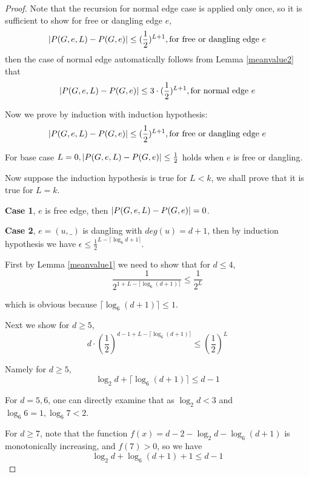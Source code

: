 	\begin{proof}

		Note that the recursion for normal edge case is applied only once, so it is sufficient to show for free or dangling edge $e$,
		\[\left\vert P(G,e,L) - P(G,e)\right\vert \leq (\frac{1}{2})^{L+1}, \textrm{for free or dangling edge $e$}\]
		then the case of normal edge automatically follows from Lemma \ref{meanvalue2} that
		\[\left\vert P(G,e,L) - P(G,e)\right\vert \leq 3\cdot(\frac{1}{2})^{L+1}, \textrm{for normal edge $e$}\]

		Now we prove by induction with induction hypothesis:
		\[\left\vert P(G,e,L) - P(G,e)\right\vert \leq (\frac{1}{2})^{L+1}, \textrm{for free or dangling edge $e$}\]
		
		For base case $L=0, \left\vert P(G,e,L) - P(G,e)\right\vert \leq \frac{1}{2}$ holds when $e$ is free or dangling.

		Now suppose the induction hypothesis is true for $L<k$, we shall prove that it is true for $L=k$.

		{\bf Case 1}, $e$ is free edge, then $\left\vert P(G,e,L) - P(G,e)\right\vert = 0$.

		{\bf Case 2}, $e=(u,\_)$ is dangling with $deg(u)=d+1$, then by induction hypothesis we have
		$\epsilon \leq \frac{1}{2}^{L-\lceil \log_6{d+1}\rceil}$.

		First by Lemma \ref{meanvalue1} we need to show that for $d \leq 4$,
		\[\frac{1}{2^{1+L-\lceil \log_6{(d+1)}\rceil}} \leq \frac{1}{2^L}\]

		which is obvious because $\lceil\log_6{(d+1)}\rceil \leq 1$.

		Next we show for $d \geq 5$,
		\[ d\cdot \left( \frac{1}{2} \right)^{d-1 + L - \lceil \log_6{(d+1)}\rceil}  \leq \left( \frac{1}{2} \right)^L \]

		Namely for $d \geq 5$,
		\[ \log_2 d + \lceil \log_6{(d+1)} \rceil \leq d-1\]

		For $d=5,6$, one can directly examine that as $\log_2 d < 3$ and $\log_6 6 =1, \log_6 7 < 2$.


		For $d\geq 7$, note that the function $f(x) = d-2 -\log_2 d - \log_6{(d+1)}$ is monotonically increasing, and $f(7)>0$, so we have
        \[ \log_2 d + \log_6{(d+1)} + 1 \leq d-1\]


\end{proof}
